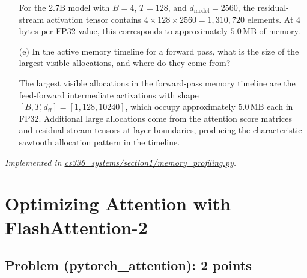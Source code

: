 \documentclass[letterpaper]{article}
\newcommand{\repofile}[2]{\href{https://github.com/echung32/ece405-assignment4-hpc/blob/main/#1}{#2}}
\begin{document}
\begin{itemize}
		For the 2.7B model with \(B=4\), \(T=128\), and \(d_{\text{model}}=2560\), the residual-stream activation tensor contains \(4 \times 128 \times 2560 = 1{,}310{,}720\) elements. At 4 bytes per FP32 value, this corresponds to approximately \(5.0\,\mathrm{MB}\) of memory.
		
		\item[(e)] In the active memory timeline for a forward pass, what is the size of the largest visible allocations, and where do they come from?
		
		The largest visible allocations in the forward-pass memory timeline are the feed-forward intermediate activations with shape \([B,T,d_{\text{ff}}] = [1,128,10240]\), which occupy approximately \(5.0\,\mathrm{MB}\) each in FP32. Additional large allocations come from the attention score matrices and residual-stream tensors at layer boundaries, producing the characteristic sawtooth allocation pattern in the timeline.
	\end{itemize}
	
	\textit{Implemented in \repofile{cs336_systems/section1/memory_profiling.py}{cs336\_systems/section1/memory\_profiling.py}.}
	
	\section{Optimizing Attention with FlashAttention-2}
	
	\subsection{Problem (pytorch\_attention): 2 points}
	
\end{document}
